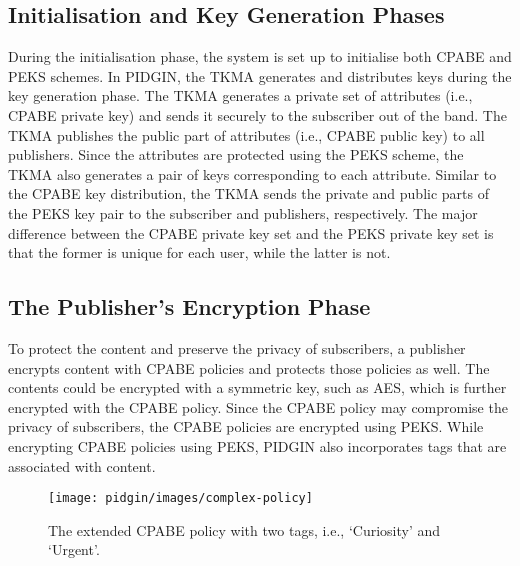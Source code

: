\documentclass[epsfig,a4paper,11pt,titlepage]{book}
\numberwithin{algorithm}{chapter}
\begin{document}
\subsection{Initialisation and Key Generation Phases}
During the initialisation phase, the system is set up to initialise both \gls{CPABE} and \gls{PEKS} schemes. In \gls{PIDGIN}, the \gls{TKMA} generates and distributes keys during the key generation phase. The \gls{TKMA} generates a private set of attributes (i.e., \gls{CPABE} private key) and sends it securely to the subscriber out of the band. The \gls{TKMA} publishes the public part of attributes (i.e., \gls{CPABE} public key) to all publishers. Since the attributes are protected using the \gls{PEKS} scheme, the \gls{TKMA} also generates a pair of keys corresponding to each attribute. Similar to the \gls{CPABE} key distribution, the \gls{TKMA} sends the private and public parts of the \gls{PEKS} key pair to the subscriber and publishers, respectively. The major difference between the \gls{CPABE} private key set and the \gls{PEKS} private key set is that the former is unique for each user, while the latter is not.

\subsection{The Publisher's Encryption Phase}
To protect the content and preserve the privacy of subscribers, a publisher encrypts content with \gls{CPABE} policies and protects those policies as well. The contents could be encrypted with a symmetric key, such as \gls{AES}, which is further encrypted with the \gls{CPABE} policy. Since the \gls{CPABE} policy may compromise the privacy of subscribers, the \gls{CPABE} policies are encrypted using \gls{PEKS}. While encrypting \gls{CPABE} policies using \gls{PEKS}, \gls{PIDGIN} also incorporates tags that are associated with content.

\begin{figure} [htp]
\centering
\texttt{[image: pidgin/images/complex-policy]}
\caption[The extended CPABE policy with multiple tags]{The extended \gls{CPABE} policy with two tags, i.e., `Curiosity' and `Urgent'.}
\label{fig:pidgin-complex-policy}
\end{figure}
\end{document}

